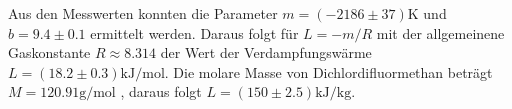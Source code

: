 Aus den Messwerten konnten die Parameter $m = (-2186 \pm 37) \unit{\kelvin}$ und $b = 9.4 \pm 0.1$ ermittelt werden. Daraus folgt für $L = -m/R$ mit der
allgemeinene Gaskonstante $R \approx 8.314$ \cite{scipy} der Wert der Verdampfungswärme $L = (18.2 \pm 0.3) \unit{\kilo\joule\per\mol}$. Die molare Masse von Dichlordifluormethan
beträgt $M = 120.91 \unit{\gram\per\mol}$ \cite{Dichlordifluormethan}, daraus folgt $L = (150 \pm 2.5) \unit{\kilo\joule\per\kilogram}$.

